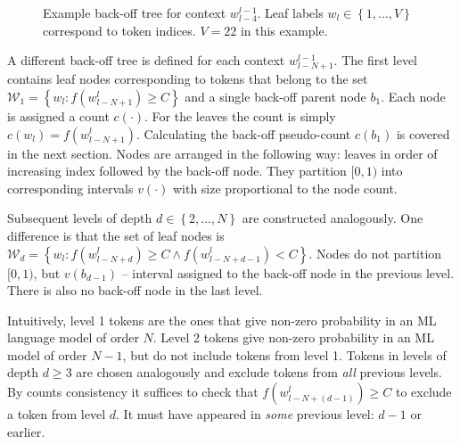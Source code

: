 \documentclass{IIBproject}
\begin{document}
\begin{figure}[h]
\caption{\label{fig:backoff_tree}Example back-off tree for context $w_{l-4}^{l-1}$. Leaf labels $w_l \in \left\{ 1, \dots, V \right\}$ correspond to token indices. $V=22$ in this example.}
\end{figure}

A different back-off tree is defined for each context $w_{l-N+1}^{l-1}$. The first level contains leaf nodes corresponding to tokens that belong to the set $\mathcal W_1 = \left\{ w_l : f(w_{l-N+1}^l) \ge C \right\}$ and a single back-off parent node $b_1$. Each node is assigned a count $c(\cdot)$. For the leaves the count is simply $c(w_l) = f(w_{l-N+1}^l)$. Calculating the back-off pseudo-count $c(b_1)$ is covered in the next section. Nodes are arranged in the following way: leaves in order of increasing index followed by the back-off node. They partition $[0,1)$ into corresponding intervals $v(\cdot)$ with size proportional to the node count.

Subsequent levels of depth $d \in \left\{ 2, \dots, N \right\}$ are constructed analogously. One difference is that the set of leaf nodes is $\mathcal W_d = \left\{ w_l : f(w_{l-N+d}^l) \ge C \land f(w_{l-N+d-1}^l) < C \right\}$. Nodes do not partition $[0,1)$, but $v(b_{d-1})$ -- interval assigned to the back-off node in the previous level. There is also no back-off node in the last level.

Intuitively, level 1 tokens are the ones that give non-zero probability in an ML language model of order $N$. Level 2 tokens give non-zero probability in an ML model of order $N-1$, but do not include tokens from level 1. Tokens in levels of depth $d \ge 3$ are chosen analogously and exclude tokens from \emph{all} previous levels. By counts consistency it suffices to check that $f(w_{l-N+(d-1)}^l) \ge C$ to exclude a token from level $d$. It must have appeared in \emph{some} previous level: $d-1$ or earlier.
\end{document}
